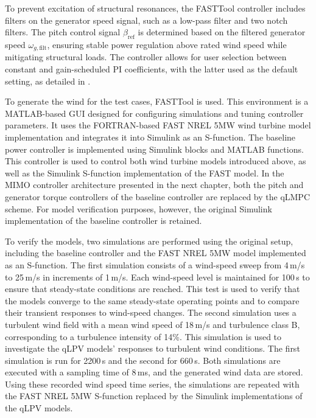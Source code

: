     To prevent excitation of structural resonances, the FASTTool controller includes filters on the generator speed signal, such as a low-pass filter and two notch filters. The pitch control signal \(\beta_{\text{ref}}\) is determined based on the filtered generator speed \(\omega_{g,\text{filt}}\), ensuring stable power regulation above rated wind speed while mitigating structural loads. The controller allows for user selection between constant and gain-scheduled PI coefficients, with the latter used as the default setting, as detailed in \cite{mulders2020wind}.
       
    To generate the wind for the test cases, FASTTool is used. This environment is a MATLAB-based GUI designed for configuring simulations and tuning controller parameters. It uses the FORTRAN-based FAST NREL 5MW wind turbine model implementation and integrates it into Simulink as an S-function. The baseline power controller is implemented using Simulink blocks and MATLAB functions. This controller is used to control both wind turbine models introduced above, as well as the Simulink S-function implementation of the FAST model. In the MIMO controller architecture presented in the next chapter, both the pitch and generator torque controllers of the baseline controller are replaced by the qLMPC scheme. For model verification purposes, however, the original Simulink implementation of the baseline controller is retained. 
    
    To verify the models, two simulations are performed using the original setup, including the baseline controller and the FAST NREL 5MW model implemented as an S-function. The first simulation consists of a wind-speed sweep from 4\,m/s to 25\,m/s in increments of 1\,m/s. Each wind-speed level is maintained for 100\,s to ensure that steady-state conditions are reached. This test is used to verify that the models converge to the same steady-state operating points and to compare their transient responses to wind-speed changes. The second simulation uses a turbulent wind field with a mean wind speed of 18\,m/s and turbulence class B, corresponding to a turbulence intensity of 14\%. This simulation is used to investigate the qLPV models' responses to turbulent wind conditions. The first simulation is run for 2200\,s and the second for 660\,s. Both simulations are executed with a sampling time of 8\,ms, and the generated wind data are stored. Using these recorded wind speed time series, the simulations are repeated with the FAST NREL 5MW S-function replaced by the Simulink implementations of the qLPV models.
    
